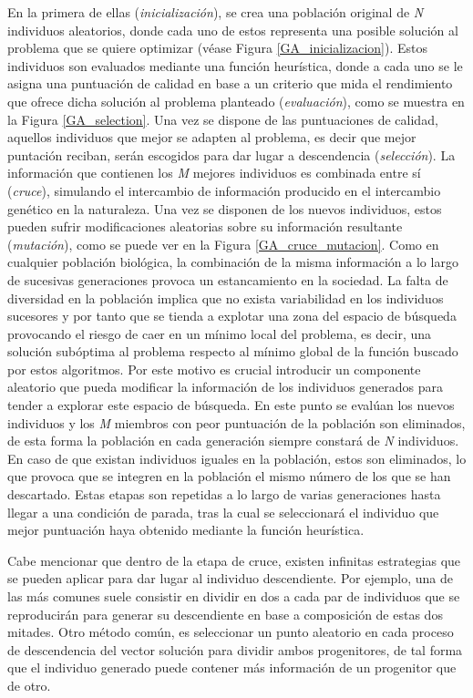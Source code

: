 \documentclass{uathesis-es}
\begin{document}
	En la primera de ellas (\textit{inicialización}), se crea una población original de \textit{N} individuos aleatorios, donde cada uno de estos representa una posible solución al problema que se quiere optimizar (véase Figura \ref{GA_inicializacion}). Estos individuos son evaluados mediante una función heurística, donde a cada uno se le asigna una puntuación de calidad en base a un criterio que mida el rendimiento que ofrece dicha solución al problema planteado (\textit{evaluación}), como se muestra en la Figura \ref{GA_selection}. Una vez se dispone de las puntuaciones de calidad, aquellos individuos que mejor se adapten al problema, es decir que mejor puntación reciban, serán escogidos para dar lugar a descendencia (\textit{selección}). La información que contienen los \textit{M} mejores individuos es combinada entre sí (\textit{cruce}), simulando el intercambio de información producido en el intercambio genético en la naturaleza. Una vez se disponen de los nuevos individuos, estos pueden sufrir modificaciones aleatorias sobre su información resultante (\textit{mutación}), como se puede ver en la Figura \ref{GA_cruce_mutacion}. Como en cualquier población biológica, la combinación  de la misma información a lo largo de sucesivas generaciones provoca un estancamiento en la sociedad. La falta de diversidad en la población implica que no exista variabilidad en los individuos sucesores y por tanto que se tienda a explotar una zona del espacio de búsqueda provocando el riesgo de caer en un mínimo local del problema, es decir, una solución subóptima al problema respecto al mínimo global de la función buscado por estos algoritmos. Por este motivo es crucial introducir un componente aleatorio que pueda modificar la información de los individuos generados para tender a explorar este espacio de búsqueda. En este punto se evalúan los nuevos individuos y los \textit{M} miembros con peor puntuación de la población son eliminados, de esta forma la población en cada generación siempre constará de \textit{N} individuos. En caso de que existan individuos iguales en la población, estos son eliminados, lo que provoca que se integren en la población el mismo número de los que se han descartado. Estas etapas son repetidas a lo largo de varias generaciones hasta llegar a una condición de parada, tras la cual se seleccionará el individuo que mejor puntuación haya obtenido mediante la función heurística.
	
	Cabe mencionar que dentro de la etapa de cruce, existen infinitas estrategias que se pueden aplicar para dar lugar al individuo descendiente. Por ejemplo, una de las más comunes suele consistir en dividir en dos a cada par de individuos que se reproducirán para generar su descendiente en base a composición de estas dos mitades. Otro método común, es seleccionar un punto aleatorio en cada proceso de descendencia del vector solución para dividir ambos progenitores, de tal forma que el individuo generado puede contener más información de un progenitor que de otro.
	
\end{document}
